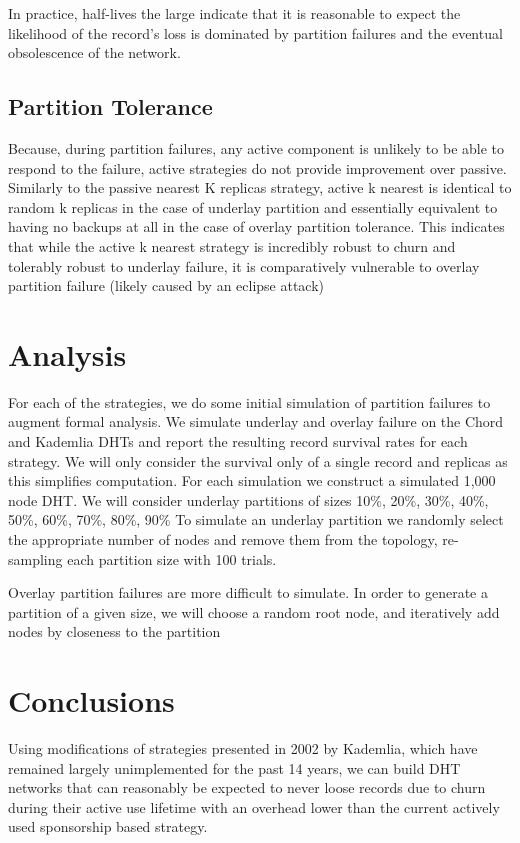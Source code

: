 \documentclass[conference]{IEEEtran}
\begin{document}
In practice, half-lives the large indicate that it is reasonable to expect the likelihood of the record's loss is dominated by partition failures and the eventual obsolescence of the network.

\subsection{Partition Tolerance}
Because, during partition failures, any active component is unlikely to be able to respond to the failure, active strategies do not provide improvement over passive.
Similarly to the passive nearest K replicas strategy, active k nearest is identical to random k replicas in the case of underlay partition and essentially equivalent to having no backups at all in the case of overlay partition tolerance.
This indicates that while the active k nearest strategy is incredibly robust to churn and tolerably robust to underlay failure, it is comparatively vulnerable to overlay partition failure (likely caused by an eclipse attack)


\section{Analysis}

For each of the strategies, we do some initial simulation of partition failures to augment formal analysis.
We simulate underlay and overlay failure on the Chord and Kademlia DHTs and report the resulting record survival rates for each strategy.
We will only consider the survival only of a single record and replicas as this simplifies computation. 
For each simulation we construct a simulated 1,000 node DHT.
We will consider underlay partitions of sizes 10\%, 20\%, 30\%, 40\%, 50\%, 60\%, 70\%, 80\%, 90\%
To simulate an underlay partition we randomly select the appropriate number of nodes and remove them from the topology, re-sampling each partition size with 100 trials.

Overlay partition failures are more difficult to simulate.
In order to generate a partition of a given size, we will choose a random root node, and iteratively add nodes by closeness to the partition 





\section{Conclusions}

Using modifications of strategies presented in 2002 by Kademlia\cite{kademlia}, which have remained largely unimplemented for the past 14 years, we can build DHT networks that can reasonably be expected to never loose records due to churn during their active use lifetime with an overhead lower than the current actively used sponsorship based strategy.



\end{document}
